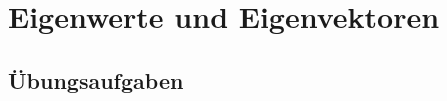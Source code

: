 %
%
%
\chapter{Eigenwerte und Eigenvektoren
\label{buch:chapter:eigenwerte-und-eigenvektoren}}
\rhead{}






\section*{Übungsaufgaben}
\begin{uebungsaufgaben}
\end{uebungsaufgaben}

